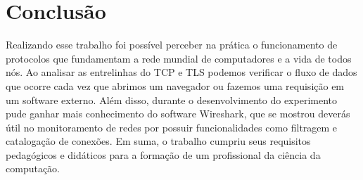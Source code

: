 \documentclass[12pt]{article}
\begin{document}
\section{Conclusão}

Realizando esse trabalho foi possível perceber na prática o funcionamento de protocolos que fundamentam a rede mundial de computadores e a vida de todos nós. Ao analisar as entrelinhas do TCP e TLS podemos verificar o fluxo de dados que ocorre cada vez que abrimos um navegador ou fazemos uma requisição em um software externo. Além disso, durante o desenvolvimento do experimento pude ganhar mais conhecimento do software Wireshark, que se mostrou deverás útil no monitoramento de redes por possuir funcionalidades como filtragem e catalogação de conexões. Em suma, o trabalho cumpriu seus requisitos pedagógicos e didáticos para a formação de um profissional da ciência da computação.
\end{document}
